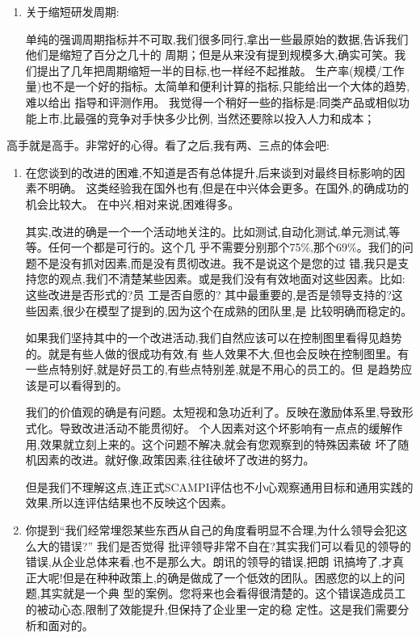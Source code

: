 \documentclass[11pt]{article}
\begin{document}
\begin{staff}
\begin{enumerate}
  \item 关于缩短研发周期:

    单纯的强调周期指标并不可取,我们很多同行,拿出一些最原始的数据,告诉我们他们是缩短了百分之几十的
    周期；但是从来没有提到规模多大,确实可笑。我们提出了几年把周期缩短一半的目标,也一样经不起推敲。
    生产率(规模/工作量)也不是一个好的指标。太简单和便利计算的指标,只能给出一个大体的趋势,难以给出
    指导和评测作用。 我觉得一个稍好一些的指标是:同类产品或相似功能上市,比最强的竞争对手快多少比例,
    当然还要除以投入人力和成本；
\end{enumerate}
\end{staff}

\begin{yang}
\ylogo 高手就是高手。非常好的心得。看了之后,我有两、三点的体会吧:
\begin{enumerate}
  \item 在您谈到的改进的困难,不知道是否有总体提升,后来谈到对最终目标影响的因素不明确。
   这类经验我在国外也有,但是在中兴体会更多。在国外,的确成功的机会比较大。
   在中兴,相对来说,困难得多。

   其实,改进的确是一个一个活动地关注的。比如测试,自动化测试,单元测试,等等。任何一个都是可行的。这个几
   乎不需要分别那个75\%,那个69\%。我们的问题不是没有抓对因素,而是没有贯彻改进。我不是说这个是您的过
   错,我只是支持您的观点,我们不清楚某些因素。或是我们没有有效地面对这些因素。比如:这些改进是否形式的?员
   工是否自愿的? 其中最重要的,是否是领导支持的?这些因素,很少在模型了提到的,因为这个在成熟的团队里,是
   比较明确而稳定的。

   如果我们坚持其中的一个改进活动,我们自然应该可以在控制图里看得见趋势的。就是有些人做的很成功有效,有
   些人效果不大,但也会反映在控制图里。有一些点特别好,就是好员工的,有些点特别差,就是不用心的员工的。但
   是趋势应该是可以看得到的。

   我们的价值观的确是有问题。太短视和急功近利了。反映在激励体系里,导致形式化。导致改进活动不能贯彻好。
   个人因素对这个坏影响有一点点的缓解作用,效果就立刻上来的。这个问题不解决,就会有您观察到的特殊因素破
   坏了随机因素的改进。就好像,政策因素,往往破坏了改进的努力。
   
   但是我们不理解这点,连正式SCAMPI评估也不小心观察通用目标和通用实践的效果,所以连评估结果也不反映这个因素。

  \item 你提到``我们经常埋怨某些东西从自己的角度看明显不合理,为什么领导会犯这么大的错误?'' 我们是否觉得
   批评领导非常不自在?其实我们可以看见的领导的错误,从企业总体来看,也不是那么大。朗讯的领导的错误,把朗
   讯搞垮了,才真正大呢!但是在种种政策上,的确是做成了一个低效的团队。困惑您的以上的问题,其实就是一个典
   型的案例。您将来也会看得很清楚的。这个错误造成员工的被动心态,限制了效能提升,但保持了企业里一定的稳
   定性。这是我们需要分析和面对的。


\end{enumerate}
\end{yang}
\end{document}
